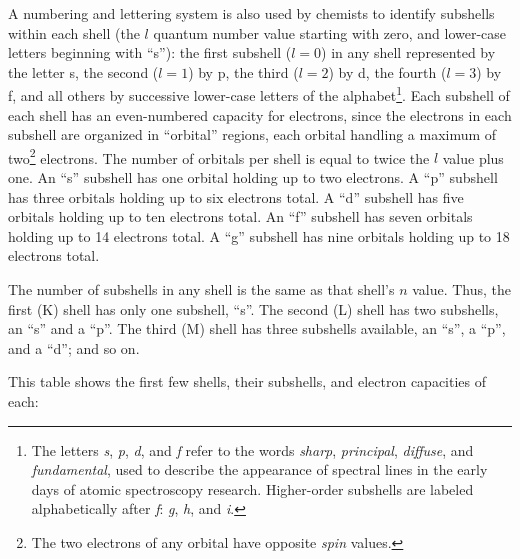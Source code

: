 A numbering and lettering system is also used by chemists to identify subshells within each shell (the $l$ quantum number value starting with zero, and lower-case letters beginning with ``s''): the first subshell ($l = 0$) in any shell represented by the letter s, the second ($l = 1$) by p, the third ($l = 2$) by d, the fourth ($l = 3$) by f, and all others by successive lower-case letters of the alphabet\footnote{The letters \textit{s}, \textit{p}, \textit{d}, and \textit{f} refer to the words \textit{sharp}, \textit{principal}, \textit{diffuse}, and \textit{fundamental}, used to describe the appearance of spectral lines in the early days of atomic spectroscopy research.  Higher-order subshells are labeled alphabetically after \textit{f}: \textit{g}, \textit{h}, and \textit{i}.}.  Each subshell of each shell has an even-numbered capacity for electrons, since the electrons in each subshell are organized in ``orbital'' regions, each orbital handling a maximum of two\footnote{The two electrons of any orbital have opposite \textit{spin} values.} electrons.  The number of orbitals per shell is equal to twice the $l$ value plus one.  An ``s'' subshell has one orbital holding up to two electrons.  A ``p'' subshell has three orbitals holding up to six electrons total.  A ``d'' subshell has five orbitals holding up to ten electrons total.  An ``f'' subshell has seven orbitals holding up to 14 electrons total.  A ``g'' subshell has nine orbitals holding up to 18 electrons total.

The number of subshells in any shell is the same as that shell's $n$ value.  Thus, the first (K) shell has only one subshell, ``s''.  The second (L) shell has two subshells, an ``s'' and a ``p''.  The third (M) shell has three subshells available, an ``s'', a ``p'', and a ``d''; and so on.

\filbreak

This table shows the first few shells, their subshells, and electron capacities of each:


